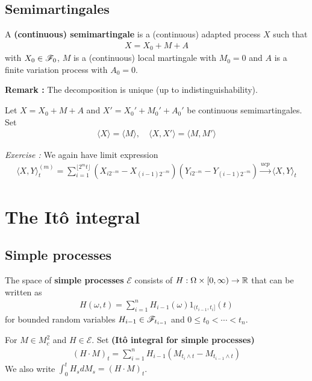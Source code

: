 \documentclass[12pt,a4paper]{article}
\begin{document}
\subsection{Semimartingales}

 A \textbf{(continuous) semimartingale} is a (continuous) adapted process $X$ such that 
\begin{align*}
X = X_0 + M +A
\end{align*}
with $X_0 \in \mathscr{F}_0$, $M$ is a (continuous) local martingale with $M_0 =0$ and $A$ is a finite variation process with $A_0 =0$.
\s

\textbf{Remark :} The decomposition is unique (up to indistinguishability).
\s

 Let $X = X_0 + M +A$ and $X' = X_0' + M_0' + A_0'$ be continuous semimartingales. Set 
\begin{align*}
\langle X \rangle = \langle M \rangle, \quad \langle X, X' \rangle = \langle M, M' \rangle
\end{align*}
\s

\emph{Exercise :} We again have limit expression
\begin{align*}
\langle X, Y \rangle_{t}^{(m)} = \sum_{i=1}^{\lfloor 2^m t\rfloor} (X_{i2^{-m}} -X_{(i-1)2^{-m}})(Y_{i2^{-m}} -Y_{(i-1)2^{-m}}) \xrightarrow{ucp} \langle X, Y \rangle_t
\end{align*}

\section{The It\^o integral}

\subsection{Simple processes}

 The space of \textbf{simple processes} $\mathscr{E}$ consists of $H : \Omega \times [0, \infty) \rightarrow \mathbb{R}$ that can be written as
\begin{align*}
H(\omega, t) = \sum_{i=1}^n H_{i-1}(\omega) 1_{(t_{i-1}, t_i]} (t)
\end{align*}
for bounded random variables $H_{i-1} \in \mathscr{F}_{t_{i-1}}$ and $0\leq t_0 < \cdots < t_n$. 
\s

  For $M\in M^2_c$ and $H\in \mathscr{E}$. Set \textbf{(It\^o integral for simple processes)}
\begin{align*}
(H\cdot M)_t = \sum_{i=1}^n H_{i-1} (M_{t_i \wedge t} - M_{t_{i-1} \wedge t})
\end{align*}
We also write $\int_0^t H_s dM_s = (H\cdot M)_t$.
\end{document}
